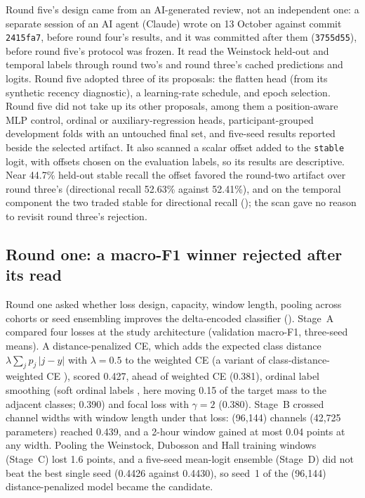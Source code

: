 \documentclass[10pt,twocolumn]{article}
\begin{document}
Round five's design came from an AI-generated review, not an independent
one: a separate session of an AI agent (Claude) wrote
 on 13 October against
commit \texttt{2415fa7}, before round four's results, and it was
committed after them (\texttt{3755d55}), before round five's protocol
was frozen. It read the Weinstock held-out and temporal labels through
round two's and round three's cached predictions and logits. Round five
adopted three of its proposals: the flatten head (from its synthetic
recency diagnostic), a learning-rate schedule, and epoch selection. Round
five did not take up its other proposals, among them a position-aware
MLP control, ordinal or auxiliary-regression heads, participant-grouped
development folds with an untouched final set, and five-seed results
reported beside the selected artifact. It also scanned a scalar
offset added to the \texttt{stable} logit, with offsets chosen on the
evaluation labels, so its results are descriptive. Near 44.7\% held-out
stable recall the offset favored the round-two artifact over round
three's (directional recall 52.63\% against 52.41\%), and on the temporal
component the two traded stable for directional recall
(); the scan gave no reason to revisit round
three's rejection.

\subsection{Round one: a macro-F1 winner rejected after its read}
\label{sec:sweep1}

Round one asked whether loss design, capacity, window length, pooling
across cohorts or seed ensembling improves the delta-encoded classifier
(). Stage~A compared four losses at the
study architecture (validation macro-F1, three-seed means). A
distance-penalized CE, which adds the expected class distance
$\lambda \sum_j p_j\,|j-y|$ with $\lambda=0.5$ to the weighted CE (a
variant of class-distance-weighted CE \cite{polat2022cdwce}),
scored 0.427, ahead of weighted CE (0.381), ordinal label smoothing
(soft ordinal labels \cite{diaz2019softlabels}, here moving 0.15 of the
target mass to the adjacent classes; 0.390) and focal loss with $\gamma=2$
\cite{lin2017focal} (0.380). Stage~B crossed channel widths with window
length under that loss: (96,144) channels (42,725 parameters) reached
0.439, and a 2-hour window gained at most 0.04 points at any width.
Pooling the Weinstock, Dubosson and Hall training windows (Stage~C) lost
1.6 points, and a five-seed mean-logit ensemble (Stage~D) did not beat
the best single seed (0.4426 against 0.4430), so seed~1 of the (96,144)
distance-penalized model became the candidate.
\end{document}
